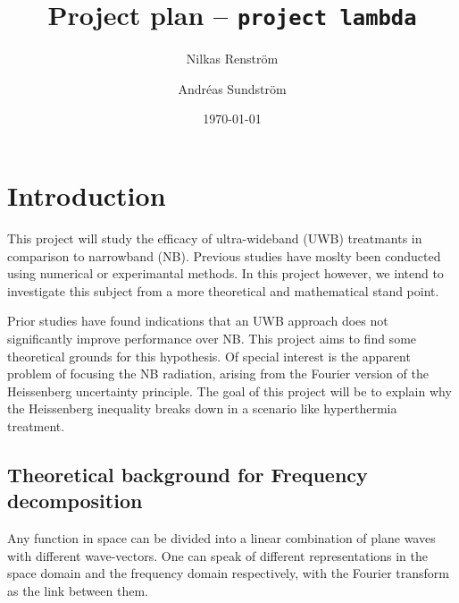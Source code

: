 \documentclass[11pt,a4paper, 
english, swedish %
]{article}
\begin{document}



\title{Project plan -- \texttt{project lambda}}
\author{Nilkas Renström \and Andréas Sundström}
\date{\today}

\maketitle




\section{Introduction}

This project will study the efficacy of ultra-wideband (UWB) treatmants in comparison to narrowband (NB). Previous studies have moslty been conducted using numerical or experimantal methods. In this project however, we intend to investigate this subject from a more theoretical and mathematical stand point. 

Prior studies have found indications that an UWB approach does not significantly improve performance over NB. This project aims to find some theoretical grounds for this hypothesis. Of special interest is the apparent problem of focusing the NB radiation, arising from the Fourier version of the Heissenberg uncertainty principle. The goal of this project will be to explain why the Heissenberg inequality breaks down in a scenario like hyperthermia treatment. 


\subsection{Theoretical background for Frequency decomposition}
Any function in space can be divided into a linear combination of plane waves with different wave-vectors.%
One can speak of different representations in the space domain and the frequency domain respectively, with the Fourier transform as the link between them.
\end{document}
